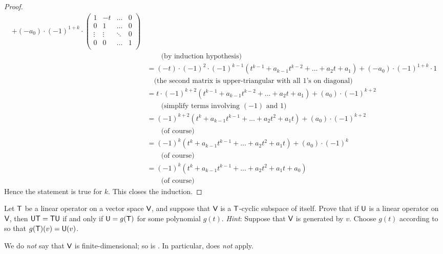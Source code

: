 \begin{proof}
\begin{align*}
      + (-a_0) \cdot (-1)^{1 + k} \cdot \begin{pmatrix}
            1      & -t     & \dots  & 0 \\
            0      & 1      & \dots  & 0 \\
            \vdots & \vdots & \ddots & 0 \\
            0      & 0      & \dots  & 1 \\
        \end{pmatrix} \\
    & \quad \quad \text{(by induction hypothesis)} \\
    & = (-t) \cdot (-1)^{2} \cdot (-1)^{k - 1} (t^{k - 1} + a_{k - 1} t^{k-2} + ... + a_2 t + a_1) + (-a_0) \cdot (-1)^{1 + k} \cdot 1 \\
    & \quad \text{(the second matrix is upper-triangular with all \(1\)'s on diagonal)} \\
    & = t \cdot (-1)^{k + 2} (t^{k - 1} + a_{k - 1} t^{k-2} + ... + a_2 t + a_1) + (a_0) \cdot (-1)^{k + 2} \\
    & \quad \quad \text{(simplify terms involving \((-1)\) and \(1\))} \\
    & = (-1)^{k + 2} (t^k + a_{k - 1} t^{k-1} + ... + a_2 t^2 + a_1 t) + (a_0) \cdot (-1)^{k + 2} \\
    & \quad \quad \text{(of course)} \\
    & = (-1)^k (t^k + a_{k - 1} t^{k-1} + ... + a_2 t^2 + a_1 t) + (a_0) \cdot (-1)^k \\
    & \quad \quad \text{(of course)} \\
    & = (-1)^k (t^k + a_{k - 1} t^{k-1} + ... + a_2 t^2 + a_1 t + a_0) \\
    & \quad \quad \text{(of course)}
\end{align*}
Hence the statement is true for \(k\).
This closes the induction.
\end{proof}

\begin{exercise} \label{exercise 5.4.20}
Let \(\textsf{T}\) be a linear operator on a vector space \(\textsf{V}\), and suppose that \(\textsf{V}\) is a \(\textsf{T}\)-cyclic subspace of itself.
Prove that if \(\textsf{U}\) is a linear operator on \(\textsf{V}\), then \(\textsf{U}\textsf{T} = \textsf{T}\textsf{U}\) if and only if \(\textsf{U} = g(\textsf{T})\) for some polynomial \(g(t)\).
\emph{Hint}: Suppose that \(\textsf{V}\) is generated by \(v\).
Choose \(g(t)\) according to  so that \(g(\textsf{T})(v) = \textsf{U}(v)\).
\end{exercise}

\begin{note}
We do \emph{not} say that \(\textsf{V}\) is finite-dimensional; so is .
In particular,  does \emph{not} apply.
\end{note}


